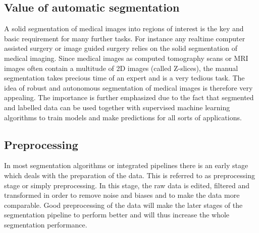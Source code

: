 \documentclass[journal]{IEEEtran}
\begin{document}
\subsection{Value of automatic segmentation}
A solid segmentation of medical images into regions of interest is the key and basic requirement for many further tasks. For instance any realtime computer assisted surgery or image guided surgery relies on the solid segmentation of medical imaging. Since medical images as computed tomography scans or MRI images often contain a multitude of 2D images (called Z-slices), the manual segmentation takes precious time of an expert and is a very tedious task. The idea of robust and autonomous segmentation of medical images is therefore  very appealing. The importance is further emphasized due to the fact that segmented and labelled data can be used together with supervised machine learning algorithms to train models and make predictions for all sorts of applications.


\subsection{Preprocessing}
In most segmentation algorithms or integrated pipelines there is an early stage which deals with the preparation of the data. This is referred to as preprocessing stage or simply preprocessing. In this stage, the raw data is edited, filtered and transformed in order to remove noise and biases and to make the data more comparable. Good preprocessing of the data will make the later stages of the segmentation pipeline to perform better and will thus increase the whole segmentation performance.


%
%
\end{document}
